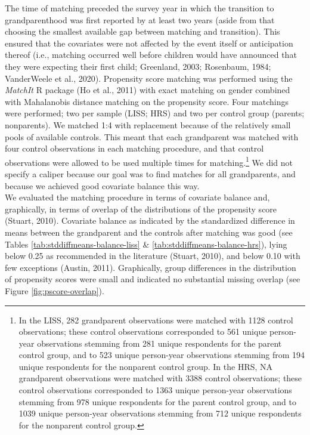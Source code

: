 \documentclass[
  english,
  man,floatsintext]{apa7}
\begin{document}
The time of matching preceded the survey year in which the transition to grandparenthood was first reported by at least two years (aside from that choosing the smallest available gap between matching and transition). This ensured that the covariates were not affected by the event itself or anticipation thereof (i.e., matching occurred well before children would have announced that they were expecting their first child; Greenland, 2003; Rosenbaum, 1984; VanderWeele et al., 2020). Propensity score matching was performed using the \emph{MatchIt} R package (Ho et al., 2011) with exact matching on gender combined with Mahalanobis distance matching on the propensity score. Four matchings were performed; two per sample (LISS; HRS) and two per control group (parents; nonparents). We matched 1:4 with replacement because of the relatively small pools of available controls. This meant that each grandparent was matched with four control observations in each matching procedure, and that control observations were allowed to be used multiple times for matching.\footnote{In the LISS, 282 grandparent observations were matched with 1128 control observations; these control observations corresponded to 561 unique person-year observations stemming from 281 unique respondents for the parent control group, and to 523 unique person-year observations stemming from 194 unique respondents for the nonparent control group. In the HRS, NA grandparent observations were matched with 3388 control observations; these control observations corresponded to 1363 unique person-year observations stemming from 978 unique respondents for the parent control group, and to 1039 unique person-year observations stemming from 712 unique respondents for the nonparent control group.} We did not specify a caliper because our goal was to find matches for all grandparents, and because we achieved good covariate balance this way.\\
We evaluated the matching procedure in terms of covariate balance and, graphically, in terms of overlap of the distributions of the propensity score (Stuart, 2010). Covariate balance as indicated by the standardized difference in means between the grandparent and the controls after matching was good (see Tables \ref{tab:stddiffmeans-balance-liss} \& \ref{tab:stddiffmeans-balance-hrs}), lying below 0.25 as recommended in the literature (Stuart, 2010), and below 0.10 with few exceptions (Austin, 2011). Graphically, group differences in the distribution of propensity scores were small and indicated no substantial missing overlap (see Figure \ref{fig:pscore-overlap}).\\
\end{document}
